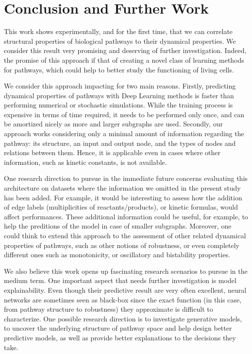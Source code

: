 \section{Conclusion and Further Work}
This work shows experimentally, and for the first time, that we can correlate structural properties of biological pathways to their dynamical properties. We consider this result very promising and deserving of further investigation. Indeed, the promise of this approach if that of creating a novel class of learning methods for pathways, which could help to better study the functioning of living cells.

We consider this approach impacting for two main reasons. Firstly, predicting dynamical properties of pathways with Deep Learning methods is faster than performing numerical or stochastic simulations. While the training process is expensive in terms of time required, it needs to be performed only once, and can be amortized nicely as more and larger subgraphs are used. Secondly, our approach works considering only a minimal amount of information regarding the pathway: its structure, an input and output node, and the types of nodes and relations between them. Hence, it is applicable even in cases where other information, such as kinetic constants, is not available.

One research direction to pursue in the immediate future concerns evaluating this architecture on datasets where the information we omitted in the present study has been added. For example, it would be interesting to assess how the addition of edge labels (multiplicities of reactants/products), or kinetic formulas, would affect performances. These additional information could be useful, for example, to help the preditions of the model in case of smaller subgraphs. Moreover, one could think to extend this approach to the assessment of other related dynamical properties of pathways, such as other notions of robustness, or even completely different ones such as monotonicity, or oscillatory and bistability properties.

We also believe this work opens up fascinating research scenarios to pursue in the medium term. One important aspect that needs further investigation is model explainability. Even though their predictive result are very often excellent, neural networks are sometimes seen as black-box since the exact function (in this case, from pathway structure to robustness) they approximate is difficult to characterize. One possible research direction is to investigate generative models, to uncover the underlying structure of pathway space and help design better predictive models, as well as provide better explanations to the decisions they take.
